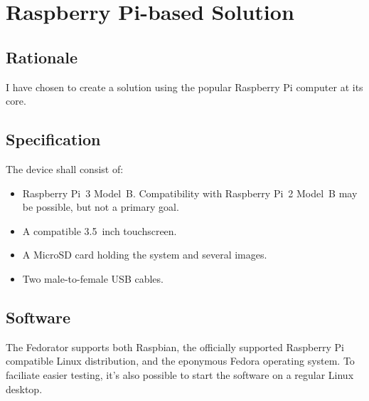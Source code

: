 \chapter{Raspberry Pi-based Solution}
    \section{Rationale}
        I have chosen to create a solution using the popular Raspberry Pi computer at its core.
        
        \blind[2]
    \section{Specification}
        The device shall consist of:
        \begin{itemize}
            \item Raspberry Pi~3 Model~B.  Compatibility with Raspberry Pi~2 Model~B may be possible, but not a primary goal.
            \item A compatible 3.5~inch touchscreen.
            \item A MicroSD card holding the system and several images.
            \item Two male-to-female USB cables.
        \end{itemize}
    
    \section{Software}
        The Fedorator supports both Raspbian, the officially supported Raspberry Pi compatible Linux distribution\cite{raspian}, and the eponymous Fedora operating system.  To faciliate easier testing, it's also possible to start the software on a regular Linux desktop.
        
